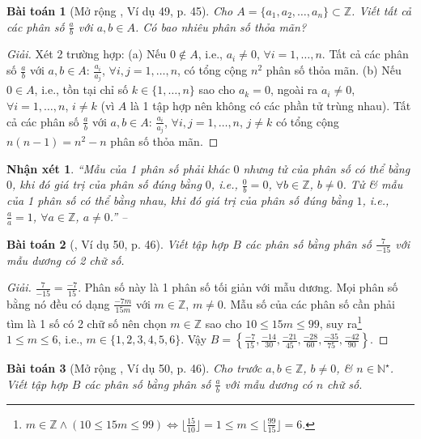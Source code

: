 \documentclass{article}
\numberwithin{equation}{section}
\newtheorem{baitoan}{Bài toán}
\newtheorem{nhanxet}{Nhận xét}[section]
\begin{document}
\begin{baitoan}[Mở rộng \cite{Tuyen_Toan_6}, Ví dụ 49, p. 45]
	Cho $A = \{a_1,a_2,\ldots,a_n\}\subset\mathbb{Z}$. Viết tất cả các phân số $\frac{a}{b}$ với $a,b\in A$. Có bao nhiêu phân số thỏa mãn?
\end{baitoan}

\begin{proof}[Giải]
	Xét 2 trường hợp: (a) Nếu $0\notin A$, i.e., $a_i\ne0$, $\forall i = 1,\ldots,n$. Tất cả các phân số $\frac{a}{b}$ với $a,b\in A$: $\frac{a_i}{a_j}$, $\forall i,j = 1,\ldots,n$, có tổng cộng $n^2$ phân số thỏa mãn. (b) Nếu $0\in A$, i.e., tồn tại chỉ số $k\in\{1,\ldots,n\}$ sao cho $a_k = 0$, ngoài ra $a_i\ne 0$, $\forall i = 1,\ldots,n$, $i\ne k$ (vì $A$ là 1 tập hợp nên không có các phần tử trùng nhau). Tất cả các phân số $\frac{a}{b}$ với $a,b\in A$: $\frac{a_i}{a_j}$, $\forall i,j = 1,\ldots,n$, $j\ne k$ có tổng cộng $n(n - 1) = n^2 - n$ phân số thỏa mãn.
\end{proof}

\begin{nhanxet}
	``Mẫu của 1 phân số phải khác $0$ nhưng tử của phân số có thể bằng $0$, khi đó giá trị của phân số đúng bằng $0$, i.e., $\frac{0}{b} = 0$, $\forall b\in\mathbb{Z}$, $b\ne 0$. Tử \& mẫu của 1 phân số có thể bằng nhau, khi đó giá trị của phân số đúng bằng $1$, i.e., $\frac{a}{a} = 1$, $\forall a\in\mathbb{Z}$, $a\ne 0$.'' -- \cite[p. 46]{Tuyen_Toan_6}
\end{nhanxet}

\begin{baitoan}[\cite{Tuyen_Toan_6}, Ví dụ 50, p. 46]
	Viết tập hợp $B$ các phân số bằng phân số $\frac{7}{-15}$ với mẫu dương có 2 chữ số.
\end{baitoan}

\begin{proof}[Giải]
	$\frac{7}{-15} = \frac{-7}{15}$. Phân số này là 1 phân số tối giản với mẫu dương. Mọi phân số bằng nó đều có dạng $\frac{-7m}{15m}$ với $m\in\mathbb{Z}$, $m\ne0$. Mẫu số của các phân số cần phải tìm là 1 số có 2 chữ số nên chọn $m\in\mathbb{Z}$ sao cho $10\le15m\le 99$, suy ra\footnote{$m\in\mathbb{Z}\land(10\le15m\le 99)\Leftrightarrow\lfloor\frac{15}{10}\rfloor = 1\le m\le\lfloor\frac{99}{15}\rfloor = 6$.} $1\le m\le6$, i.e., $m\in\{1,2,3,4,5,6\}$. Vậy $B = \left\{\frac{-7}{15},\frac{-14}{30},\frac{-21}{45},\frac{-28}{60},\frac{-35}{75},\frac{-42}{90}\right\}$.
\end{proof}

\begin{baitoan}[Mở rộng \cite{Tuyen_Toan_6}, Ví dụ 50, p. 46]
	Cho trước $a,b\in\mathbb{Z}$, $b\ne0$, \& $n\in\mathbb{N}^\star$. Viết tập hợp $B$ các phân số bằng phân số $\frac{a}{b}$ với mẫu dương có $n$ chữ số.
\end{baitoan}
\end{document}
